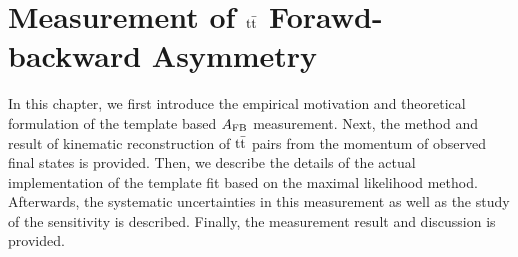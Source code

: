 \chapter{Measurement of $\mathrm{t}\bar{\mathrm{t}}$ Forawd-backward Asymmetry}
\label{sec:afb measurement}

In this chapter, we first introduce the empirical motivation and theoretical formulation of the template based $A_{\mathrm{FB}}$ measurement. Next, the method and result of kinematic reconstruction of $\mathrm{t}\bar{\mathrm{t}}$ pairs from the momentum of observed final states is provided. Then, we describe the details of the actual implementation of the template fit based on the maximal likelihood method. Afterwards, the systematic uncertainties in this measurement as well as the study of the sensitivity is described. Finally, the measurement result and discussion is provided.




  